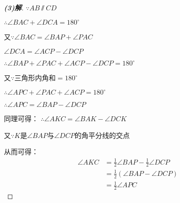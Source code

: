 \documentclass[fleqn]{ctexart}
\begin{document}
\begin{proof}[\textbf{(3)解}]
  $\because AB \varparallel CD$

  $\therefore \angle BAC + \angle DCA = 180^\circ$

  又$\because \angle BAC = \angle BAP + \angle PAC$
  
  $\angle DCA = \angle ACP - \angle DCP$

  $\therefore \angle BAP + \angle PAC + \angle ACP - \angle DCP = 180^\circ$

  又$\because$三角形内角和$=180^\circ$
  
  $\therefore \angle APC + \angle PAC + \angle ACP = 180^\circ$

  $\therefore \angle APC = \angle BAP - \angle DCP$

  同理可得：
  $\therefore \angle AKC = \angle BAK - \angle DCK$
  
  又$\because K$是$\angle BAP$与$\angle DCP$的角平分线的交点

  从而可得：
  \begin{align*}
    \angle AKC & = \frac{1}{2}\angle BAP - \frac{1}{2}\angle DCP \\
               & = \frac{1}{2}\left(\angle BAP - \angle DCP\right) \\
               & = \frac{1}{2}\angle APC                 
  \end{align*}  
\end{proof}

        
        
\end{document}
